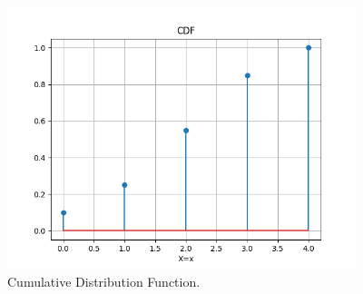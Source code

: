 \documentclass{beamer}
\begin{document}
\begin{frame}
    \begin{figure}[!ht]
        \includegraphics[width=4in, height=3in]{figures/cdf.png}
        \caption{Cumulative Distribution Function.}
    \end{figure}
\end{frame}
\end{document}
